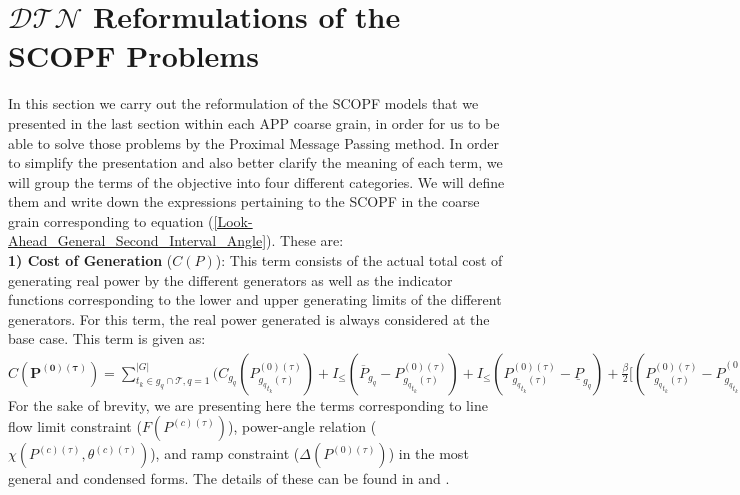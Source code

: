 \documentclass[preprint,12pt,3p]{elsarticle}
\begin{document}
\section{$\mathcal{DTN}$ Reformulations of the SCOPF Problems}
\label{DTNFormulation}
In this section we carry out the reformulation of the SCOPF models that we presented in the last section within each APP coarse grain, in order for us to be able to solve those problems by the Proximal Message Passing method. In order to simplify the presentation and also better clarify the meaning of each term, we will group the terms of the objective into four different categories. We will define them and write down the expressions pertaining to the SCOPF in the coarse grain corresponding to equation (\ref{Look-Ahead_General_Second_Interval_Angle}). These are:\\
\textbf{1) Cost of Generation} ($C(P)$): This term consists of the actual total cost of generating real power by the different generators as well as the indicator functions corresponding to the lower and upper generating limits of the different generators. For this term, the real power generated is always considered at the base case. This term is given as:\\
$C(\mathbf{P^{(0)(\tau)}})=\sum_{t_k\in g_q\cap{\mathcal{T}}, q=1}^{|G|}\bigg(C_{g_q}({P}_{{g_q}_{t_k}(\tau)}^{(0)(\tau)})+I_{\leq}(\overline{P}_{g_q}-{P}_{{g_q}_{t_k}(\tau)}^{(0)(\tau)})
+I_{\leq}({P}_{{g_q}_{t_k}(\tau)}^{(0)(\tau)}-\underline{P}_{g_q})+\frac{\beta}{2}\bigg[({P}_{{g_q}_{t_k}(\tau)}^{(0)(\tau)}-{P}_{{g_q}_{t_k}(\tau)}^{(0)(\tau)(\mu_{APP})})^2+\sum_{s=-1,1}({P}_{{g_q}_{t_k}(\tau)}^{(0)(\tau+s)}-{P}_{{g_q}_{t_k}(\tau)}^{(0)(\tau+s)(\mu_{APP})})^2\bigg]+\gamma\bigg[\sum_{s=-1,1}({P}_{{g_q}_{t_k}(\tau)}^{(0)(\tau)}({P}_{{g_q}_{t_k}(\tau)}^{(0)(\tau)(\mu_{APP})}-{P}_{{g_q}_{t_k}(0)(\tau+s)}^{(0)(\tau)(\mu_{APP})})+{P}_{{g_q}_{t_k}(\tau)}^{(0)(\tau+s)}({P}_{{g_q}_{t_k}(\tau)}^{(0)(\tau+s)(\mu_{APP})}-{P}_{{g_q}_{t_k}(0)(\tau+s)}^{(0)(\tau+s)(\mu_{APP})}))\bigg]+(\lambda_{{g_q}2(\tau-1)}^{(\mu_{APP})}-\lambda_{{g_q}(2\tau-2)}^{(\mu_{APP})}){P}_{{g_q}_{t_k}(\tau)}^{(0)(\tau)}+\lambda_{{g_q}(2\tau)}^{(\mu_{APP})}{P}_{{g_q}_{t_k}(\tau)}^{(0)(\tau+1)}-\lambda_{{g_q}(2\tau-3)}^{(\mu_{APP})}{P}_{{g_q}_{t_k}(\tau)}^{(0)(\tau-1)}\bigg)$\\
For the sake of brevity, we are presenting here the terms corresponding to line flow limit constraint ($F(P^{(c)(\tau)})$), power-angle relation ($\chi(P^{(c)(\tau)},\theta^{(c)(\tau)})$), and ramp constraint ($\Delta(P^{(0)(\tau)})$) in the most general and condensed forms. The details of these can be found in \cite{CK:14} and \cite{Sambuddha2017}.\\
\end{document}
